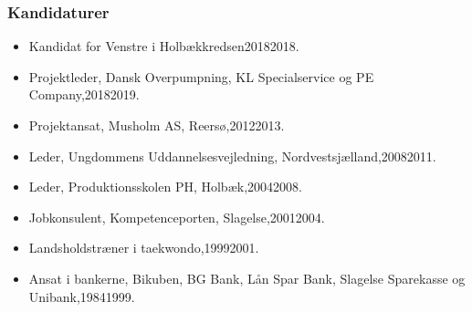 \documentclass[11pt, a4paper]{awesome-cv}
\begin{document}
\begin{cvletter}
\subsubsection*{Kandidaturer}
\begin{itemize}
\item Kandidat for Venstre i Holbækkredsen20182018.
\end{itemize}
\begin{itemize}
\item Projektleder, Dansk Overpumpning, KL Specialservice og PE Company,20182019.
\item Projektansat, Musholm AS, Reersø,20122013.
\item Leder, Ungdommens Uddannelsesvejledning, Nordvestsjælland,20082011.
\item Leder, Produktionsskolen PH, Holbæk,20042008.
\item Jobkonsulent, Kompetenceporten, Slagelse,20012004.
\item Landsholdstræner i taekwondo,19992001.
\item Ansat i bankerne, Bikuben, BG Bank, Lån  Spar Bank, Slagelse Sparekasse og Unibank,19841999.
\end{itemize}
\end{cvletter}
\end{document}
